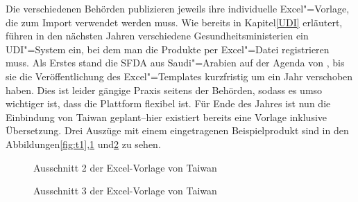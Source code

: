 Die verschiedenen Behörden publizieren jeweils ihre individuelle Excel"=Vorlage, die zum Import verwendet werden muss. Wie bereits in Kapitel\nbs\ref{UDI} erläutert, führen in den nächsten Jahren verschiedene Gesundheitsministerien ein UDI"=System ein, bei dem man die Produkte per Excel"=Datei registrieren muss. Als Erstes stand die SFDA aus Saudi"=Arabien auf der Agenda von , bis sie die Veröffentlichung des Excel"=Templates kurzfristig um ein Jahr verschoben haben. Dies ist leider gängige Praxis seitens der Behörden, sodass es umso wichtiger ist, dass die Plattform flexibel ist. Für Ende des Jahres ist nun die Einbindung von Taiwan geplant\nbs --\nbs hier existiert bereits eine Vorlage inklusive Übersetzung. Drei Auszüge mit einem eingetragenen Beispielprodukt sind in den Abbildungen\nbs\ref{fig:t1},\nbs\ref{fig:t2} und\nbs\ref{fig:t3} zu sehen.

\begin{figure}[htbp]
 \centering
 \caption[Excel-Vorlage für Taiwan -- Ausschnitt 2]{Ausschnitt 2 der Excel-Vorlage von Taiwan}
 \label{fig:t2}
\end{figure}
\begin{figure}[htbp]
 \centering
 \caption[Excel-Vorlage für Taiwan -- Ausschnitt 3]{Ausschnitt 3 der Excel-Vorlage von Taiwan}
 \label{fig:t3}
\end{figure}

